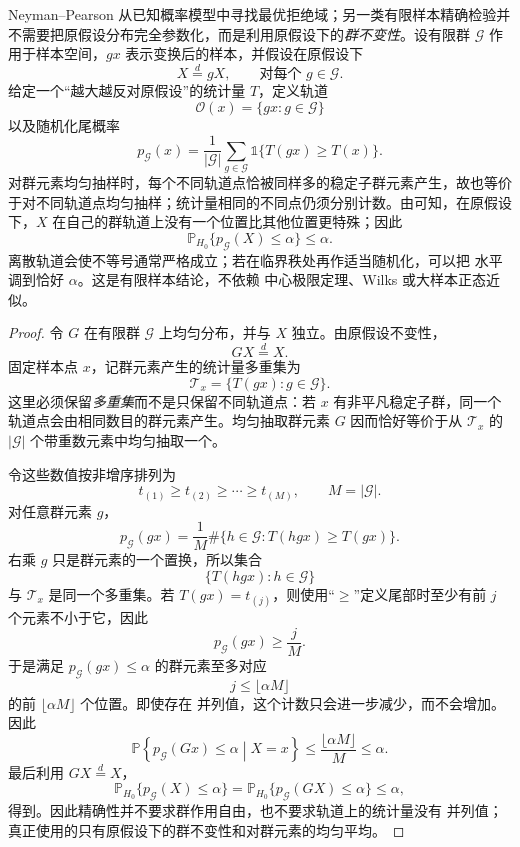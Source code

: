 \begin{theorem}[有限群不变性下的精确检验]
Neyman--Pearson 从已知概率模型中寻找最优拒绝域；另一类有限样本精确检验并不需要把原假设分布完全参数化，而是利用原假设下的\emph{群不变性}。设有限群 $\mathcal G$ 作用于样本空间，$g x$ 表示变换后的样本，并假设在原假设下
\begin{equation}\label{eq:math-stat-group-invariance-null}
 X\overset{d}=gX,
 \qquad
 \text{对每个 }g\in\mathcal G.
\end{equation}
给定一个“越大越反对原假设”的统计量 $T$，定义轨道
\[
 \mathcal O(x)=\{gx:g\in\mathcal G\}
\]
以及随机化尾概率
\begin{equation*}p_{\mathcal G}(x)
 =\frac{1}{|\mathcal G|}
 \sum_{g\in\mathcal G}
 \mathds{1}\{T(gx)\ge T(x)\}.
\end{equation*}
对群元素均匀抽样时，每个不同轨道点恰被同样多的稳定子群元素产生，故也等价于对不同轨道点均匀抽样；统计量相同的不同点仍须分别计数。由可知，在原假设下，$X$ 在自己的群轨道上没有一个位置比其他位置更特殊；因此
\begin{equation}\label{eq:math-stat-randomization-validity}
 \mathbb P_{H_0}\{p_{\mathcal G}(X)\le\alpha\}
 \le\alpha.
\end{equation}
离散轨道会使不等号通常严格成立；若在临界秩处再作适当随机化，可以把 水平 调到恰好 $\alpha$。这是有限样本结论，不依赖 中心极限定理、Wilks 或大样本正态近似。
\end{theorem}

\begin{proof}
令 $G$ 在有限群 $\mathcal G$ 上均匀分布，并与 $X$ 独立。由原假设不变性，
\[
 GX\overset{d}=X.
\]
固定样本点 $x$，记群元素产生的统计量多重集为
\[
 \mathcal T_x=\{T(gx):g\in\mathcal G\}.
\]
这里必须保留\emph{多重集}而不是只保留不同轨道点：若 $x$ 有非平凡稳定子群，同一个轨道点会由相同数目的群元素产生。均匀抽取群元素 $G$ 因而恰好等价于从 $\mathcal T_x$ 的 $|\mathcal G|$ 个带重数元素中均匀抽取一个。

令这些数值按非增序排列为
\[
 t_{(1)}\ge t_{(2)}\ge\cdots\ge t_{(M)},
 \qquad M=|\mathcal G|.
\]
对任意群元素 $g$，
\[
 p_{\mathcal G}(gx)
 =\frac1M\#\{h\in\mathcal G:T(hgx)\ge T(gx)\}.
\]
右乘 $g$ 只是群元素的一个置换，所以集合
\[
 \{T(hgx):h\in\mathcal G\}
\]
与 $\mathcal T_x$ 是同一个多重集。若 $T(gx)=t_{(j)}$，则使用“$\ge$”定义尾部时至少有前 $j$ 个元素不小于它，因此
\[
 p_{\mathcal G}(gx)\ge\frac{j}{M}.
\]
于是满足 $p_{\mathcal G}(gx)\le\alpha$ 的群元素至多对应
\[
 j\le \lfloor \alpha M\rfloor
\]
的前 $\lfloor\alpha M\rfloor$ 个位置。即使存在 并列值，这个计数只会进一步减少，而不会增加。因此
\[
 \mathbb P\!\left\{
 p_{\mathcal G}(Gx)\le\alpha
 \middle|X=x
 \right\}
 \le
 \frac{\lfloor\alpha M\rfloor}{M}
 \le\alpha.
\]
最后利用 $GX\overset d=X$，
\[
 \mathbb P_{H_0}\{p_{\mathcal G}(X)\le\alpha\}
 =
 \mathbb P_{H_0}\{p_{\mathcal G}(GX)\le\alpha\}
 \le\alpha,
\]
得到。因此精确性并不要求群作用自由，也不要求轨道上的统计量没有 并列值；真正使用的只有原假设下的群不变性和对群元素的均匀平均。
\end{proof}


